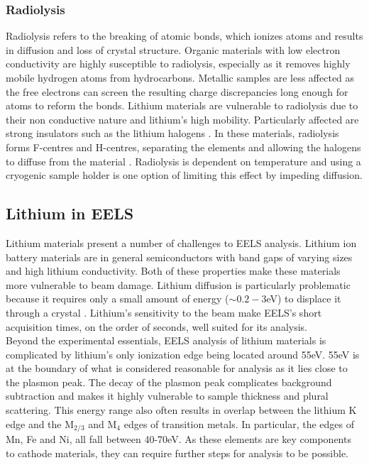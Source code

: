 \subsubsection{Radiolysis}
Radiolysis refers to the breaking of atomic bonds, which ionizes atoms and results in diffusion and loss of crystal structure.  Organic materials with low electron conductivity are highly susceptible to radiolysis, especially as it removes highly mobile hydrogen atoms from hydrocarbons.  Metallic samples are less affected as the free electrons can screen the resulting charge discrepancies long enough for atoms to reform the bonds.   Lithium materials are vulnerable to radiolysis due to their non conductive nature and lithium's high mobility.  Particularly affected are strong insulators such as the lithium halogens \cite{egerton_electron_1987}. In these materials, radiolysis forms F-centres and H-centres, separating the elements and allowing the halogens to diffuse from the material \cite{egerton_electron_1987}.  Radiolysis is dependent on temperature and using a cryogenic sample holder is one option of limiting this effect by impeding diffusion.  





\subsection{Lithium in EELS}
Lithium materials present a number of challenges to EELS analysis.  Lithium ion battery materials are in general semiconductors with band gaps of varying sizes and high lithium conductivity. Both of these properties make these materials more vulnerable to beam damage. Lithium diffusion is particularly problematic because it requires only a small amount of energy ($ \sim 0.2-3$eV) to displace it through a crystal \cite{kang_factors_2006}.  Lithium's sensitivity to the beam make EELS's short acquisition times, on the order of seconds, well suited for its analysis.\\  

Beyond the experimental essentials, EELS analysis of lithium materials is complicated by lithium's only ionization edge being located around 55eV.  55eV is at the boundary of what is considered reasonable for analysis as it lies close to the plasmon peak. The decay of the plasmon peak complicates background subtraction and makes it highly vulnerable to sample thickness and plural scattering.  This energy range also often results in overlap between the lithium K edge and the $\mathrm{M_{2 / 3}}$ and $\mathrm{M_4}$ edges of transition metals. In particular, the edges of Mn, Fe and Ni, all fall between 40-70eV.  As these elements are key components to cathode materials, they can require further steps for analysis to be possible.



